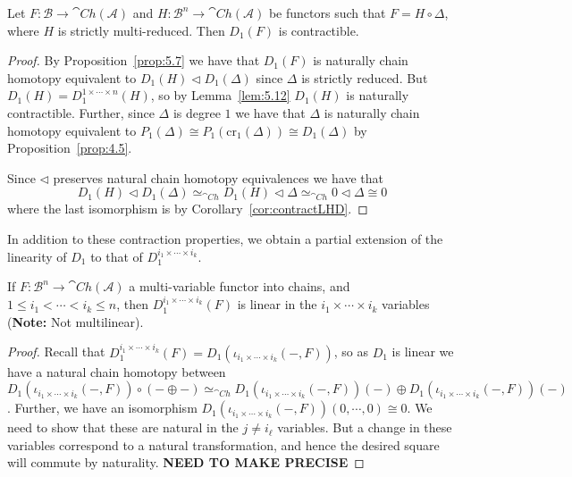 \begin{cor}[label=cor:5.13]
    Let $F:\mathcal{B}\to \cat{Ch}(\mathcal{A})$ and $H:\mathcal{B}^n\to \cat{Ch}(\mathcal{A})$ be functors such that $F = H\circ \Delta$, where $H$ is strictly multi-reduced. Then $D_1(F)$ is contractible.
\end{cor}
\begin{proof}
    By Proposition~\ref{prop:5.7} we have that $D_1(F)$ is naturally chain homotopy equivalent to $D_1(H)\lhd D_1(\Delta)$ since $\Delta$ is strictly reduced. But $D_1(H) = D_1^{1\times \cdots \times n}(H)$, so by Lemma~\ref{lem:5.12} $D_1(H)$ is naturally contractible. Further, since $\Delta$ is degree $1$ we have that $\Delta$ is naturally chain homotopy equivalent to $P_1(\Delta) \cong P_1(\text{cr}_1(\Delta)) \cong D_1(\Delta)$ by Proposition~\ref{prop:4.5}. 

    \vspace{10pt}

    Since $\lhd$ preserves natural chain homotopy equivalences we have that 
    \begin{equation*}
        D_1(H)\lhd D_1(\Delta) \simeq_{\cat{Ch}}D_1(H)\lhd \Delta \simeq_{\cat{Ch}} 0 \lhd \Delta \cong 0
    \end{equation*}
    where the last isomorphism is by Corollary~\ref{cor:contractLHD}.
\end{proof}


In addition to these contraction properties, we obtain a partial extension of the linearity of $D_1$ to that of $D_1^{i_1\times \cdots \times i_k}$.

\begin{prop}[label=prop:multiVarLin]
    If $F:\mathcal{B}^n\to \cat{Ch}(\mathcal{A})$ a multi-variable functor into chains, and $1 \leq i_1 < \cdots < i_k \leq n$, then $D_1^{i_1\times \cdots \times i_k}(F)$ is linear in the $i_1\times \cdots \times i_k$ variables (\textbf{Note:} Not multilinear).
\end{prop}
\begin{proof}
    Recall that $D_1^{i_1\times \cdots \times i_k}(F) = D_1(\iota_{i_1\times \cdots \times i_k}(-,F))$, so as $D_1$ is linear we have a natural chain homotopy between $D_1(\iota_{i_1\times \cdots \times i_k}(-,F))\circ (-\oplus -) \simeq_{\cat{Ch}} D_1(\iota_{i_1\times \cdots \times i_k}(-,F))(-)\oplus D_1(\iota_{i_1\times \cdots \times i_k}(-,F))(-)$. Further, we have an isomorphism $D_1(\iota_{i_1\times\cdots\times i_k}(-,F))(0,\cdots,0)\cong 0$. We need to show that these are natural in the $j \neq i_\ell$ variables. But a change in these variables correspond to a natural transformation, and hence the desired square will commute by naturality. \textbf{NEED TO MAKE PRECISE}
\end{proof}

